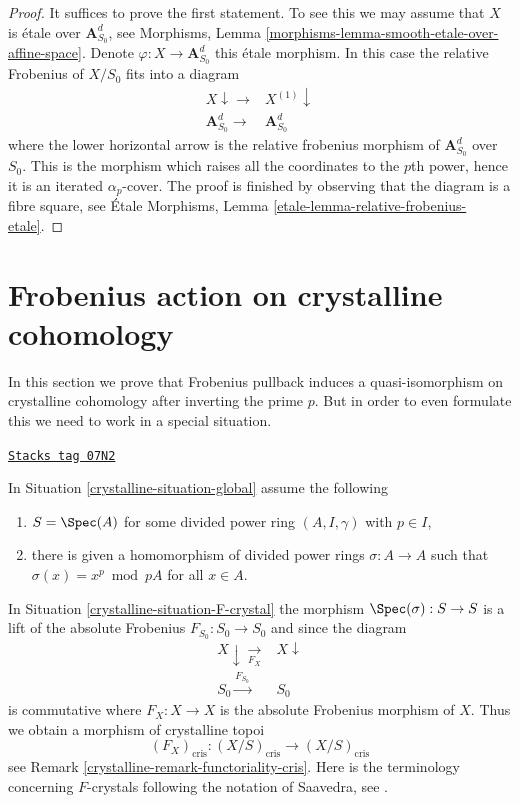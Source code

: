 \begin{proof}
It suffices to prove the first statement. To see this we may assume
that $X$ is \'etale over $\mathbf{A}^d_{S_0}$, see
Morphisms, Lemma \ref{morphisms-lemma-smooth-etale-over-affine-space}.
Denote $\varphi : X \to \mathbf{A}^d_{S_0}$ this \'etale morphism.
In this case the relative Frobenius of $X/S_0$ fits into a diagram
$$
\begin{array}{cc}X \downarrow\longrightarrow & X^{(1)} \downarrow \\ \mathbf{A}^d_{S_0} \longrightarrow & \mathbf{A}^d_{S_0}\end{array}
$$
where the lower horizontal arrow is the relative frobenius morphism
of $\mathbf{A}^d_{S_0}$ over $S_0$. This is the morphism which raises
all the coordinates to the $p$th power, hence it is an iterated
$\alpha_p$-cover. The proof is finished by observing that the diagram
is a fibre square, see
\'Etale Morphisms, Lemma \ref{etale-lemma-relative-frobenius-etale}.
\end{proof}

\section{Frobenius action on crystalline cohomology}
\label{crystalline-section-frobenius}
In this section we prove that Frobenius pullback induces a quasi-isomorphism
on crystalline cohomology after inverting the prime $p$. But in order to
even formulate this we need to work in a special situation.

\begin{definition}
\label{crystalline-situation-F-crystal}
\href{https://stacks.math.columbia.edu/tag/07N2}{\texttt{Stacks tag 07N2}}

In Situation \ref{crystalline-situation-global} assume the following
\begin{enumerate}
\item $S = \Spec(A)$ for some divided power ring $(A, I, \gamma)$
with $p \in I$,
\item there is given a homomorphism of divided power rings $\sigma : A \to A$
such that $\sigma(x) = x^p \bmod pA$ for all $x \in A$.
\end{enumerate}
\end{definition}

In Situation \ref{crystalline-situation-F-crystal} the morphism
$\Spec(\sigma) : S \to S$ is a lift of the absolute Frobenius
$F_{S_0} : S_0 \to S_0$ and since the diagram
$$
\begin{array}{cc}X \downarrow\underset{F_X}{\longrightarrow} & X \downarrow \\ S_0 \overset{F_{S_0}}{\longrightarrow} & S_0\end{array}
$$
is commutative where $F_X : X \to X$ is the absolute Frobenius morphism
of $X$. Thus we obtain a morphism of crystalline topoi
$$
(F_X)_{\text{cris}} :
(X/S)_{\text{cris}}
\longrightarrow
(X/S)_{\text{cris}}
$$
see Remark \ref{crystalline-remark-functoriality-cris}. Here is the terminology concerning
$F$-crystals following the notation of Saavedra, see
\cite{Saavedra}.

